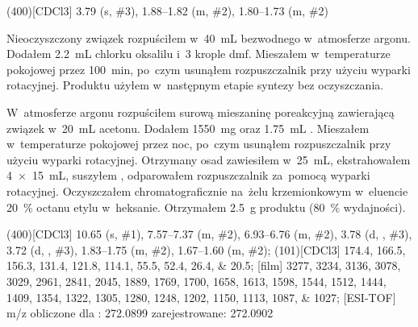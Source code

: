 \begin{fullexp}
	\NMR(400)[CDCl3] \num{3.79} (s, \#{3}), \numrange{1.88}{1.82} (m, \#{2}), \numrange{1.80}{1.73} (m, \#{2})
\end{fullexp}

Nieoczyszczony związek  rozpuściłem w~\SI{40}{\mL}
  bezwodnego  w~atmosferze argonu. Dodałem \SI{2.2}{\mL} chlorku oksalilu
  i~\num{3} krople \gls{dmf}.
Mieszałem w~temperaturze pokojowej przez \SI{100}{\minute}, po~czym usunąłem rozpuszczalnik
  przy użyciu wyparki rotacyjnej.
Produktu użyłem w~następnym etapie syntezy bez oczyszczania.

W~atmosferze argonu rozpuściłem surową mieszaninę poreakcyjną zawierającą związek
   w~\SI{20}{\mL} acetonu.
Dodałem \SI{1550}{\milli\gram}  oraz \SI{1.75}{\mL} .
Mieszałem w~temperaturze pokojowej przez noc, po~czym usunąłem rozpuszczalnik przy użyciu
  wyparki rotacyjnej.
Otrzymany osad zawiesiłem w~\SI{25}{\mL},
  ekstrahowałem \SI[product-units = single]{4 x 15}{\mL},
  suszyłem , odparowałem rozpuszczalnik za~pomocą wyparki rotacyjnej.
Oczyszczałem chromatograficznie na~żelu krzemionkowym w~eluencie \SI{20}{\percent} octanu
  etylu w~heksanie.
Otrzymałem \SI{2.5}{\gram} produktu (\SI{80}{\percent} wydajności).

\begin{fullexp}
  \NMR(400)[CDCl3] \num{10.65} (s, \#{1}), \numrange{7.57}{7.37} (m, \#{2}), \numrange{6.93}{6.76} (m, \#{2}), \num{3.78} (d, , \#{3}), \num{3.72} (d, , \#{3}), \numrange{1.83}{1.75} (m, \#{2}), \numrange{1.67}{1.60} (m, \#{2});
  (101)[CDCl3] \numlist{174.4; 166.5; 156.3; 131.4; 121.8; 114.1; 55.5; 52.4; 26.4; 20.5};
  [film] \numlist{3277; 3234; 3136; 3078; 3029; 2961; 2841; 2045; 1889; 1769; 1700; 1658; 1613; 1598; 1544; 1512; 1444; 1409; 1354; 1322; 1305; 1280; 1248; 1202; 1150; 1113; 1087; 1027};
  [ESI-TOF] m/z obliczone dla : \num{272.0899} zarejestrowane: \num{272.0902}
\end{fullexp}

